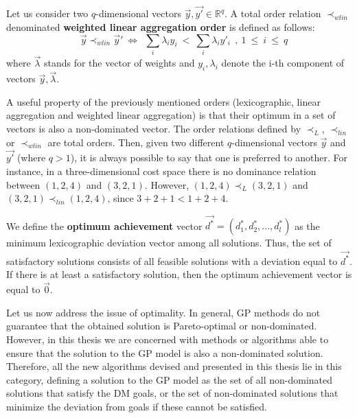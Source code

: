 \begin{defi}\label{chapMultiObjAlg:def:weightedlinorder}
Let us consider two $q$-dimensional vectors $\vec y, \vec{y'} \in \mathbb{R}^q $. A total order relation $\prec_{wlin}$ denominated \textbf{weighted linear aggregation order} is defined as follows: 
\begin{equation}\label{chapMultiObjAlg:eq:weightedlinorder} \quad 
 \vec y \prec_{wlin} \vec y' \
\Leftrightarrow \ \ 
\sum_{i}{\lambda_i y_i} \ < \ 
\sum_{i}{\lambda_i y'_i} \ \ ,\ 1~\leq~i~\leq~q
\end{equation}
where $\vec \lambda$ stands for the vector of weights and $y_i,\lambda_i$ denote the i-th component of vectors $\vec y, \vec \lambda$. 
\end{defi}

A useful property of the previously mentioned orders (lexicographic, linear aggregation and weighted linear aggregation) is that their optimum in a set of vectors is also a non-dominated vector. 
The order relations defined by $\prec_{L}$, $\prec_{lin}$ or $\prec_{wlin}$  are total orders. Then, given two different $q$-dimensional vectors $\vec y$ and $\vec{y'}$ (where $q > 1$), it is always possible to say that one is preferred to another. For instance, in a three-dimensional cost space there is no dominance relation between $(1,2,4)$ and $(3,2,1)$. However, $(1,2,4)\prec_{L} (3,2,1)$ and $(3,2,1) \prec_{lin} (1,2,4)$, since $3+2+1<1+2+4$. 


\begin{defi}\label{eq:optimum-achievement-vector}
We define the \textbf{optimum achievement} vector $\vec{d^*} = (d_1^*, d_2^*,..., d_l^*)$ as the minimum lexicographic deviation vector among all solutions. Thus, the set of 
satisfactory solutions consists of all feasible solutions with a deviation equal to $\vec{d^*}$. If there is at least a satisfactory solution, then the optimum achievement vector is equal to $\vec{0}$.
\end{defi}

Let us now address the issue of optimality. In general, GP methods do not guarantee that the obtained solution is Pareto-optimal or non-dominated. However, in this thesis we are concerned with methods or algorithms able to ensure that the solution to the GP model is also a non-dominated solution. Therefore, all the new algorithms devised and presented in this thesis lie in this category, defining a solution to the GP model as the set of all non-dominated solutions that satisfy the DM goals, or the set of non-dominated solutions that minimize the deviation from goals if these cannot be satisfied. 

